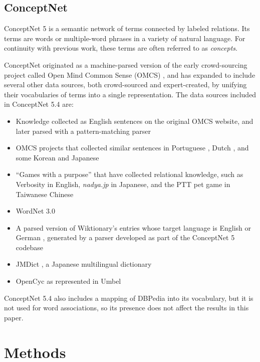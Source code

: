 \documentclass[letterpaper]{article}
\begin{document}
\subsection{ConceptNet}
ConceptNet 5 \cite{speer2012conceptnet} is a semantic network of terms
connected by labeled relations. Its terms are words or multiple-word phrases
in a variety of natural language. For continuity with previous work,
these terms are often referred to as {\em concepts}.

ConceptNet originated as a machine-parsed version of the early crowd-sourcing
project called Open Mind Common Sense (OMCS) \cite{singh2002omcs}, and has expanded
to include several other data sources, both crowd-sourced and expert-created,
by unifying their vocabularies of terms into a single representation.
The data sources included in ConceptNet 5.4 are:

\begin{itemize}
\item Knowledge collected as English sentences on the original OMCS website,
    and later parsed with a pattern-matching parser
\item OMCS projects that collected similar sentences in Portuguese
    \cite{anacleto2006portuguese},
    Dutch \cite{eckhardt2008kid}, and some Korean and Japanese
    \cite{chung2006globalmind}
\item ``Games with a purpose'' that have collected relational knowledge, such as
    Verbosity \cite{vonahn2006verbosity} in English, {\em nadya.jp}
    \cite{nakahara2011nadya} in Japanese, and the PTT pet game \cite{kuo2009petgame}
    in Taiwanese Chinese
\item WordNet 3.0 \cite{miller1998wordnet}
\item A parsed version of Wiktionary's entries whose target language is English or
      German \cite{wiktionary2014en} \cite{wiktionary2014de}, generated
      by a parser developed as part of the ConceptNet 5 codebase
\item JMDict \cite{breen2004jmdict}, a Japanese multilingual dictionary
\item OpenCyc \cite{matuszek2006cyc} as represented in Umbel \cite{bergman2008umbel}
\end{itemize}

ConceptNet 5.4 also includes a mapping of DBPedia \cite{auer2007dbpedia} into
its vocabulary, but it is not used for word associations, so its presence does
not affect the results in this paper.

\section{Methods}
\end{document}
